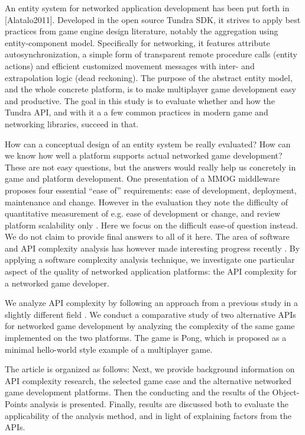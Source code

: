 \documentclass[conference]{IEEEtran}
\begin{document}
An entity system for networked application development has been put
forth in {[}Alatalo2011{]}. Developed in the open source Tundra SDK, it
strives to apply best practices from game engine design literature,
notably the aggregation using entity-component model. Specifically for
networking, it features attribute autosynchronization, a simple form
of transparent remote procedure calls (entity actions) and efficient
customized movement messages with inter- and extrapolation logic (dead
reckoning). The purpose of the abstract entity model, and the whole
concrete platform, is to make multiplayer game development easy and
productive. The goal in this study is to evaluate whether and how the
Tundra API, and with it a a few common practices in modern game and
networking libraries, succeed in that.

How can a conceptual design of an entity system be really evaluated?
How can we know how well a platform supports actual networked game
development? These are not easy questions, but the answers would
really help us concretely in game and platform development. One
presentation of a MMOG middleware proposes four essential ``ease of''
requirements: ease of development, deployment, maintenance and
change. However in the evaluation they note the difficulty of
quantitative measurement of e.g. ease of development or change, and
review platform scalability only \cite{middleware}. Here we focus on the
difficult ease-of question instead. We do not claim to provide final
answers to all of it here. The area of software and API complexity
analysis has however made interesting progress recently
\cite{api-complexity-analysis,cmu-api_failures}. By applying a software
complexity analysis technique, we investigate one particular aspect of
the quality of networked application platforms: the API complexity for
a networked game developer.

We analyze API complexity by following an approach from a previous
study in a slightly different field \cite{api-complexity-analysis}. We
conduct a comparative study of two alternative APIs for networked game
development by analyzing the complexity of the same game implemented
on the two platforms. The game is Pong, which is proposed as a minimal
hello-world style example of a multiplayer game.

The article is organized as follows: Next, we provide background
information on API complexity research, the selected game case and the
alternative networked game development platforms. Then the conducting
and the results of the Object-Points analysis is presented. Finally,
results are discussed both to evaluate the applicability of the
analysis method, and in light of explaining factors from the APIs.
\end{document}
